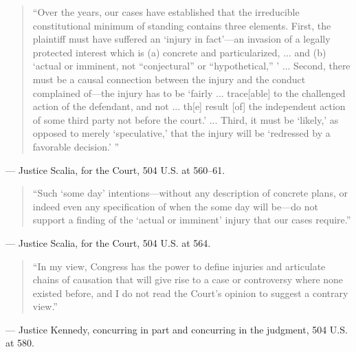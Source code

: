 \documentclass[12pt]{article}
\begin{document}
\begin{quote}
``Over the years, our cases have established that the irreducible constitutional minimum of standing contains three elements. First, the plaintiff must have suffered an `injury in fact'---an invasion of a legally protected interest which is (a) concrete and particularized, ... and (b) `actual or imminent, not ``conjectural'' or ``hypothetical,'' ' ... Second, there must be a causal connection between the injury and the conduct complained of---the injury has to be `fairly ... trace[able] to the challenged action of the defendant, and not ... th[e] result [of] the independent action of some third party not before the court.' ... Third, it must be `likely,' as opposed to merely `speculative,' that the injury will be `redressed by a favorable decision.' ''
\end{quote}
\noindent --- Justice Scalia, for the Court, 504 U.S. at 560--61.

\begin{quote}
``Such `some day' intentions---without any description of concrete plans, or indeed even any specification of when the some day will be---do not support a finding of the `actual or imminent' injury that our cases require.''
\end{quote}
\noindent --- Justice Scalia, for the Court, 504 U.S. at 564.

\begin{quote}
``In my view, Congress has the power to define injuries and articulate chains of causation that will give rise to a case or controversy where none existed before, and I do not read the Court's opinion to suggest a contrary view.''
\end{quote}
\noindent --- Justice Kennedy, concurring in part and concurring in the judgment, 504 U.S. at 580.
\end{document}
